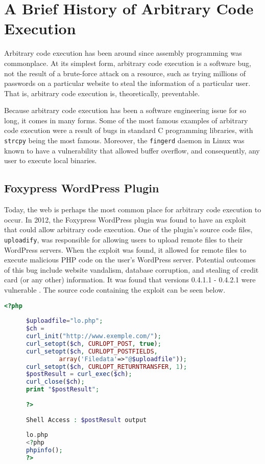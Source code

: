 \section{A Brief History of Arbitrary Code Execution}

Arbitrary code execution has been around since assembly programming was commonplace. At its simplest form, arbitrary code execution is a software bug, not the result of a brute-force attack on a resource, such as trying millions of passwords on a particular website to steal the information of a particular user. That is, arbitrary code execution is, theoretically, preventable.

Because arbitrary code execution has been a software engineering issue for so long, it comes in many forms. Some of the most famous examples of arbitrary code execution were a result of bugs in standard C programming libraries, with \texttt{strcpy} being the most famous. Moreover, the \texttt{fingerd} daemon in Linux was known to have a vulnerability that allowed buffer overflow, and consequently, any user to execute local binaries.

\subsection{Foxypress WordPress Plugin}

Today, the web is perhaps the most common place for arbitrary code execution to occur. In 2012, the Foxypress WordPress plugin was found to have an exploit that could allow arbitrary code execution. One of the plugin's source code files, \texttt{uploadify}, was responsible for allowing users to upload remote files to their WordPress servers. When the exploit was found, it allowed for remote files to execute malicious PHP code on the user's WordPress server. Potential outcomes of this bug include website vandalism, database corruption, and stealing of credit card (or any other) information. It was found that versions 0.4.1.1 - 0.4.2.1 were vulnerable \cite{foxypress_2012}. The source code containing the exploit can be seen below.

\begin{lstlisting}[language=PHP]
      <?php
       
      $uploadfile="lo.php";
      $ch = 
      curl_init("http://www.exemple.com/");
      curl_setopt($ch, CURLOPT_POST, true);
      curl_setopt($ch, CURLOPT_POSTFIELDS,
               array('Filedata'=>"@$uploadfile"));
      curl_setopt($ch, CURLOPT_RETURNTRANSFER, 1);
      $postResult = curl_exec($ch);
      curl_close($ch);
      print "$postResult";
       
      ?>
       
      Shell Access : $postResult output
       
      lo.php
      <?php
      phpinfo();
      ?>
\end{lstlisting}

